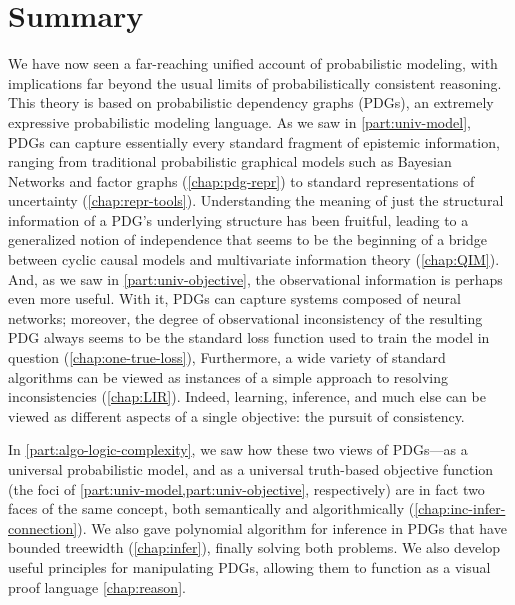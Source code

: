 
\section{Summary}

We have now seen a far-reaching unified account of probabilistic modeling,
    with implications far beyond the usual limits of probabilistically consistent reasoning. 
%
This theory is based on probabilistic dependency graphs (PDGs), an extremely expressive probabilistic modeling language.
As we saw in \cref{part:univ-model}, PDGs can capture essentially every standard fragment of epistemic information, ranging from traditional probabilistic graphical models such as Bayesian Networks and factor graphs (\cref{chap:pdg-repr}) to standard representations of uncertainty (\cref{chap:repr-tools}).
Understanding the meaning of just the structural information of a PDG's underlying structure has been fruitful, leading to a generalized notion of independence that seems to be the beginning of a bridge between cyclic causal models and multivariate information theory (\cref{chap:QIM}). 
%
And, as we saw in \cref{part:univ-objective}, the observational information is perhaps even more useful. 
With it, PDGs can capture systems composed of neural networks; moreover, 
    the degree of observational inconsistency of the resulting PDG always seems to be the standard loss function used to train the model in question (\cref{chap:one-true-loss}),
Furthermore, a wide variety of standard algorithms can be viewed as instances of a simple approach to resolving inconsistencies (\cref{chap:LIR}).
Indeed, learning, inference, and 
    much else can be viewed as different aspects of a single objective: the pursuit of consistency. 

In \cref{part:algo-logic-complexity}, we saw how these two views of PDGs---as a universal probabilistic model, and as a universal truth-based objective function (the foci of \cref{part:univ-model,part:univ-objective}, respectively) are in fact two faces of the same concept, both semantically and algorithmically (\cref{chap:inc-infer-connection}). 
We also gave polynomial algorithm for inference in PDGs that have bounded treewidth (\cref{chap:infer}), finally solving both problems. 
We also develop useful principles for manipulating PDGs, 
    allowing them to function as a visual proof language \cref{chap:reason}.


